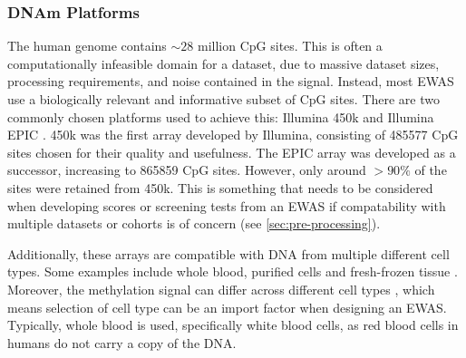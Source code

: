 \documentclass{article}
\begin{document}
\subsubsection{DNAm Platforms}
The human genome contains \(\sim\!28\) million CpG sites. This is often a computationally infeasible domain for a dataset, due to massive dataset sizes, processing requirements, and noise contained in the signal. Instead, most EWAS use a biologically relevant and informative subset of CpG sites. There are two commonly chosen platforms used to achieve this: Illumina 450k \cite{illumina2012methylation450} and Illumina EPIC \cite{illumina2015methylationepic}. 450k was the first array developed by Illumina, consisting of \num{485577} CpG sites chosen for their quality and usefulness. The EPIC array was developed as a successor, increasing to \num{865859} CpG sites. However, only around \(>90\%\) of the sites were retained from 450k. This is something that needs to be considered when developing scores or screening tests from an EWAS if compatability with multiple datasets or cohorts is of concern (see \ref{sec:pre-processing}).

Additionally, these arrays are compatible with DNA from multiple different cell types. Some examples include whole blood, purified cells and fresh-frozen tissue \cite{bhat2022data}. Moreover, the methylation signal can differ across different cell types \cite{huang2016epigenome}, which means selection of cell type can be an import factor when designing an EWAS. Typically, whole blood is used, specifically white blood cells, as red blood cells in humans do not carry a copy of the DNA.

\end{document}
